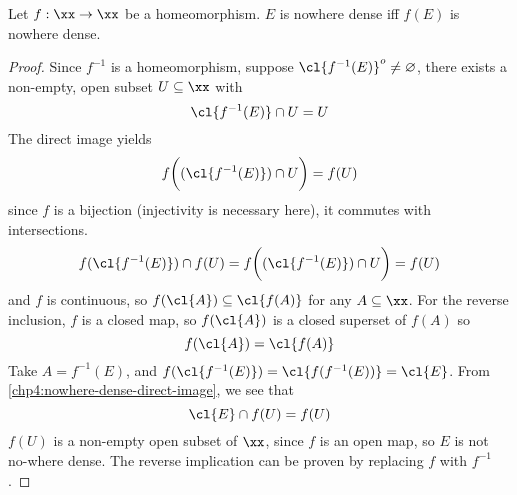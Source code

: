 \documentclass[../main-v2-manifolds.tex]{subfiles}
\begin{document}
\begin{wts}\label{chp4:nowhere-dense-homeomorphisms}
    Let $f:\xx\to\xx$ be a homeomorphism. $E$ is nowhere dense iff $f(E)$ is nowhere dense.
\end{wts}
\begin{proof}
    Since $f^{-1}$ is a homeomorphism, suppose $\cl{f^{-1}(E)}^o\neq\varnothing$, there exists a non-empty, open subset $U\subseteq\xx$ with
    \[
        \cl{f^{-1}(E)}\cap U = U
    \]
    The direct image yields 
    \[
        f\biggl((\cl{f^{-1}(E)})\cap U\biggr) = f(U)
    \]
    since $f$ is a bijection (injectivity is necessary here), it commutes with intersections.
    \begin{equation}\label{chp4:nowhere-dense-direct-image}
        f(\cl{f^{-1}(E)})\cap f(U) = f\biggl((\cl{f^{-1}(E)})\cap U\biggr) = f(U)
    \end{equation}
    and $f$ is continuous, so $f(\cl{A})\subseteq\cl{f(A)}$ for any $A\subseteq\xx$. For the reverse inclusion, $f$ is a closed map, so $f(\cl{A})$ is a closed superset of $f(A)$ so 
    \[
        f(\cl{A}) = \cl{f(A)}
    \]
    Take $A = f^{-1}(E)$, and $f(\cl{f^{-1}(E)}) = \cl{f(f^{-1}(E))} = \cl{E}$. From \cref{chp4:nowhere-dense-direct-image}, we see that
    \[
        \cl{E}\cap f(U) = f(U)
    \]
    $f(U)$ is a non-empty open subset of $\xx$, since $f$ is an open map, so $E$ is not no-where dense. The reverse implication can be proven by replacing $f$ with $f^{-1}$.
\end{proof}
\end{document}
